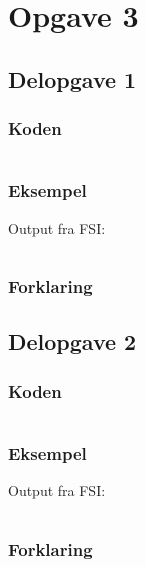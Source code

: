 \section{Opgave 3}
\subsection{Delopgave 1}\label{ass:3-1}
\subsubsection{Koden}
\begin{lstlisting}[language=fsharp]

\end{lstlisting}

\subsubsection{Eksempel}
Output fra FSI:
\begin{lstlisting}

\end{lstlisting}

\subsubsection{Forklaring}


\subsection{Delopgave 2}\label{ass:3-2}
\subsubsection{Koden}
\begin{lstlisting}[language=fsharp]

\end{lstlisting}

\subsubsection{Eksempel}
Output fra FSI:
\begin{lstlisting}

\end{lstlisting}

\subsubsection{Forklaring}


